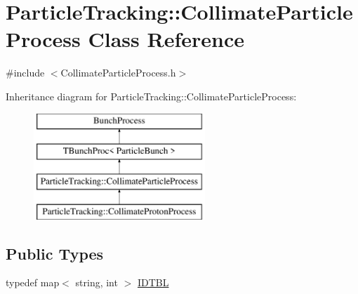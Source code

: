 \hypertarget{classParticleTracking_1_1CollimateParticleProcess}{}\section{Particle\+Tracking\+:\+:Collimate\+Particle\+Process Class Reference}
\label{classParticleTracking_1_1CollimateParticleProcess}


{\ttfamily \#include $<$Collimate\+Particle\+Process.\+h$>$}

Inheritance diagram for Particle\+Tracking\+:\+:Collimate\+Particle\+Process\+:\begin{figure}[H]
\begin{center}
\leavevmode
\includegraphics[height=4.000000cm]{classParticleTracking_1_1CollimateParticleProcess}
\end{center}
\end{figure}
\subsection*{Public Types}
\begin{DoxyCompactItemize}
\item 
typedef map$<$ string, int $>$ \hyperlink{classParticleTracking_1_1CollimateParticleProcess_ac2ecc4232755ca120567b420af5b1dc8}{I\+D\+T\+BL}
\end{DoxyCompactItemize}
